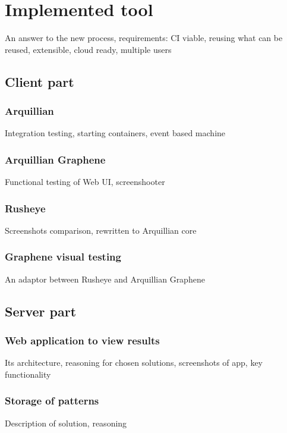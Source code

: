 \documentclass[11pt,oneside,final]{fithesis2}
\begin{document}
\chapter{Implemented tool}
An answer to the new process, requirements: CI viable, reusing what can be reused, extensible, cloud ready, multiple users

  \section{Client part}
  
    \subsection{Arquillian}
    Integration testing, starting containers, event based machine
  
    \subsection{Arquillian Graphene}
    Functional testing of Web UI, screenshooter
  
    \subsection{Rusheye}
    Screenshots comparison, rewritten to Arquillian core
  
    \subsection{Graphene visual testing}
    An adaptor between Rusheye and Arquillian Graphene
  
  \section{Server part}
  
    \subsection{Web application to view results}
    Its architecture, reasoning for chosen solutions, screenshots of app, key functionality
    
    \subsection{Storage of patterns}
    Description of solution, reasoning
    
\end{document}
